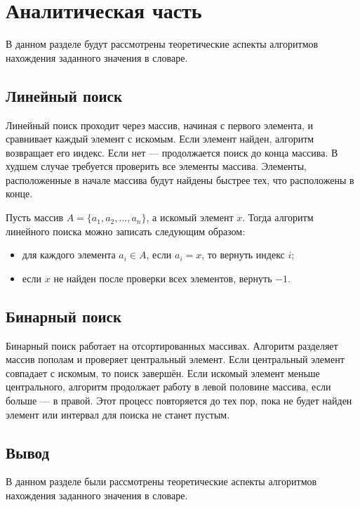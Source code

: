 \chapter{Аналитическая часть}\label{ch:-4}

В данном разделе будут рассмотрены теоретические аспекты алгоритмов нахождения заданного значения в словаре.


\section{Линейный поиск}

Линейный поиск проходит через массив, начиная с первого элемента, и сравнивает каждый элемент с искомым.
Если элемент найден, алгоритм возвращает его индекс.
Если нет — продолжается поиск до конца массива.
В худшем случае требуется проверить все элементы массива.
Элементы, расположенные в начале массива будут найдены быстрее тех, что расположены в конце.


Пусть массив $A = \{a_1, a_2, \dots, a_n\}$, а искомый элемент $x$. Тогда алгоритм линейного поиска можно записать следующим образом:

\begin{itemize}
    \item для каждого элемента $a_i \in A$, если $a_i = x$, то вернуть индекс $i$;
    \item если $x$ не найден после проверки всех элементов, вернуть $-1$.
\end{itemize}


\section{Бинарный поиск}

Бинарный поиск работает на отсортированных массивах.
Алгоритм разделяет массив пополам и проверяет центральный элемент.
Если центральный элемент совпадает с искомым, то поиск завершён.
Если искомый элемент меньше центрального, алгоритм продолжает работу в левой половине массива, если больше — в правой.
Этот процесс повторяется до тех пор, пока не будет найден элемент или интервал для поиска не станет пустым.

\section*{Вывод}

В данном разделе были рассмотрены теоретические аспекты алгоритмов нахождения заданного значения в словаре.

